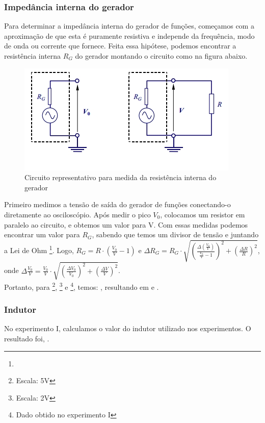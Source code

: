 \documentclass[12pt,letterpaper]{article}
\begin{document}
\subsubsection{Impedância interna do gerador} \label{itm:rger} Para determinar a impedância interna do gerador de funções, começamos com a aproximação de que esta é puramente resistiva e independe da frequência, modo de onda ou corrente que fornece. Feita essa hipótese, podemos encontrar a resistência interna $R_G$ do gerador montando o circuito como na figura abaixo. 
\begin{figure}[!htb]
  \centering
  \label{imgger}
  \includegraphics[scale=0.5]{impger.jpg}
  \caption{Circuito representativo para medida da resistência interna do gerador}
\end{figure}
Primeiro medimos a tensão de saída do gerador de funções conectando-o diretamente ao osciloscópio. Após medir o pico $V_0$, colocamos um resistor em paralelo ao circuito, e obtemos um valor para V. Com essas medidas podemos encontrar um valor para $R_G$, sabendo que temos um divisor de tensão e juntando a Lei de Ohm \footnote{}. Logo, $R_G = R \cdot (\frac{V_0}{V}-1)$ e $\Delta{R_G} = R_G \cdot \sqrt{(\frac{\Delta(\frac{V_0}{V})}{\frac{V_0}{V}-1})^2 + (\frac{\Delta{R}}{R})^2}$, onde $\Delta{\frac{V_0}{V}} = \frac{V_0}{V} \cdot \sqrt{(\frac{\Delta{V_0}}{V_0})^2 + (\frac{\Delta{V}}{V})^2}$.\\ Portanto, para \footnote{Escala: 5V}, \footnote{Escala: 2V} e \footnote{Dado obtido no experimento I}, temos: , resultando em  e .
\subsubsection{Indutor}\label{itm:indutor} No experimento I, calculamos o valor do indutor utilizado nos experimentos. O resultado foi, .
\end{document}
